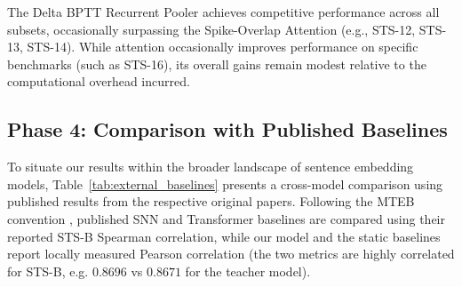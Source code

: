 \documentclass[11pt, conference, compsoc, twoside]{IEEEtran}
\begin{document}
The Delta BPTT Recurrent Pooler achieves competitive performance across all subsets, occasionally surpassing the Spike-Overlap Attention (e.g., STS-12, STS-13, STS-14). While attention occasionally improves performance on specific benchmarks (such as STS-16), its overall gains remain modest relative to the computational overhead incurred.

\subsection{Phase 4: Comparison with Published Baselines}
To situate our results within the broader landscape of sentence embedding models, Table~\ref{tab:external_baselines} presents a cross-model comparison using published results from the respective original papers. Following the MTEB convention \cite{muennighoff2022mteb}, published SNN and Transformer baselines are compared using their reported STS-B Spearman correlation, while our model and the static baselines report locally measured Pearson correlation (the two metrics are highly correlated for STS-B, e.g. $0.8696$ vs $0.8671$ for the teacher model).
\end{document}

